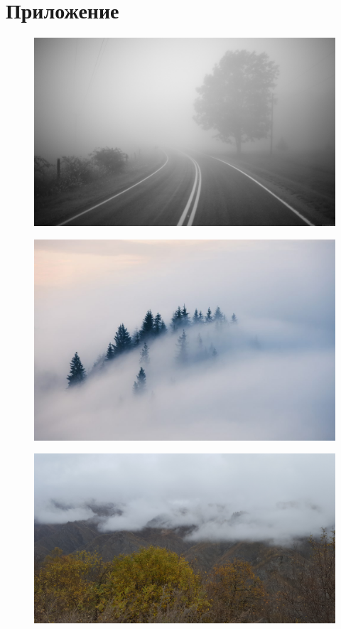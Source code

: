 \pagebreak
\section{Приложение} \label{приложение}
    
\begin{figure}[H]
    \centering
    \includegraphics[width=\linewidth]{fogs/fog01.jpg} 
    \caption{}
    \label{fig:r1}
\end{figure}

\begin{figure}[H]
    \centering
    \includegraphics[width=\linewidth]{fogs/fog02.jpg} 
    \caption{}
    \label{fig:r2}
\end{figure}

\begin{figure}[H]
    \centering
    \includegraphics[width=\linewidth]{fogs/fog03.jpg} 
    \caption{}
    \label{fig:r3}
\end{figure}

